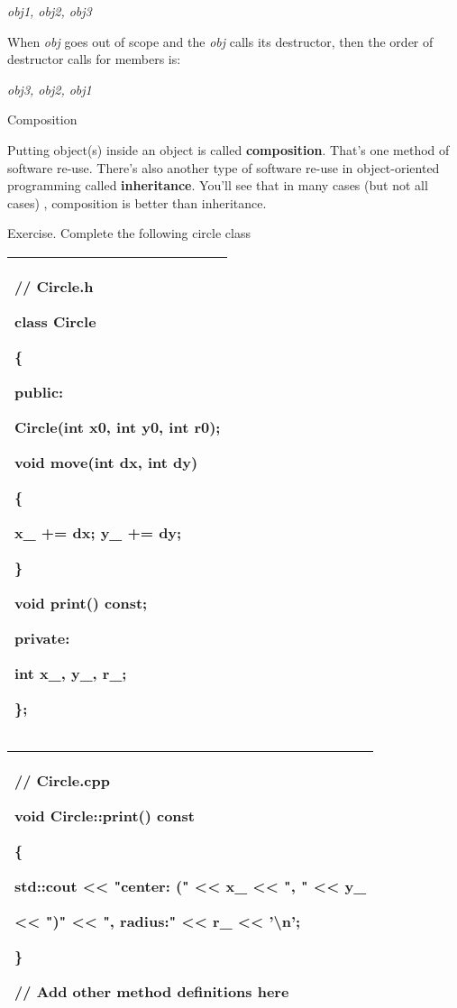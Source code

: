 \documentclass[
]{article}
\begin{document}
\emph{obj1, obj2, obj3 }

When \emph{obj} goes out of scope and the \emph{obj} calls its
destructor, then the order of destructor calls for members is:

\emph{obj3, obj2, obj1}

Composition

Putting object(s) inside an object is called \textbf{composition}.
That's one method of software re-use. There's also another type of
software re-use in object-oriented programming called
\textbf{inheritance}. You'll see that in many cases (but not all cases)
, composition is better than inheritance.

Exercise. Complete the following circle class

\begin{longtable}[]{@{}l@{}}
\toprule
\endhead
\begin{minipage}[t]{0.97\columnwidth}\raggedright
// Circle.h

class Circle

\{

public:

Circle(int x0, int y0, int r0);

void move(int dx, int dy)

\{

x\_ += dx; y\_ += dy;

\}

void print() const;

private:

int x\_, y\_, r\_;

\}; \strut
\end{minipage}\tabularnewline
\bottomrule
\end{longtable}

\begin{longtable}[]{@{}l@{}}
\toprule
\endhead
\begin{minipage}[t]{0.97\columnwidth}\raggedright
// Circle.cpp

void Circle::print() const

\{

std::cout \textless\textless{} "center: (" \textless\textless{} x\_
\textless\textless{} ", " \textless\textless{} y\_

\textless\textless{} ")" \textless\textless{} ", radius:"
\textless\textless{} r\_ \textless\textless{} '\textbackslash n';

\}

// Add other method definitions here\strut
\end{minipage}\tabularnewline
\bottomrule
\end{longtable}
\end{document}
